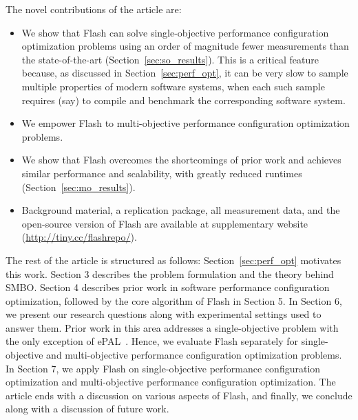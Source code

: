 \documentclass[10pt,journal,compsoc]{IEEEtran}
\newcommand{\flash}{{\sc Flash}\xspace}
\begin{document}
\noindent The novel contributions of the article are:
\begin{itemize}[leftmargin=*]
    \item  We show that \flash can  solve single-objective performance configuration optimization problems using
    an order of magnitude fewer measurements than the
    state-of-the-art (Section~\ref{sec:so_results}). This is a critical feature 
    because, as discussed in Section~\ref{sec:perf_opt}, it can be very slow
    to sample multiple properties of modern software systems, when each
    such sample requires (say) to compile and benchmark the corresponding software system.
    \item We empower \flash to multi-objective performance configuration optimization problems.%
    \item We show that \flash   overcomes the shortcomings of prior work and achieves similar performance and scalability, with greatly reduced runtimes (Section~\ref{sec:mo_results}).
    \item Background material, a replication package, all measurement data, and
the open-source version of \flash
are available at supplementary website (\url{http://tiny.cc/flashrepo/}).
\end{itemize}

The rest of the article is structured as follows: Section~\ref{sec:perf_opt} motivates this work. Section 3 describes the problem formulation and the theory behind SMBO. Section 4 describes prior work in software performance configuration optimization, followed by the core algorithm of \flash in Section 5. In Section 6, we present our research questions along with experimental settings used to answer them. Prior work in this area addresses a single-objective problem with the only exception of ePAL~\cite{zuluaga2016varepsilon}. Hence, we evaluate \flash separately for single-objective and multi-objective performance configuration optimization problems. In Section 7, we apply \flash on single-objective performance configuration optimization and multi-objective performance configuration optimization. 
The article ends with a discussion on various aspects of \flash, and finally, we conclude along with a discussion of future work.
\end{document}
